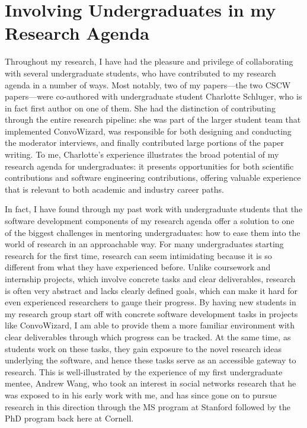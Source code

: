 \documentclass[12pt,letterpaper]{article}
\begin{document}
\section{Involving Undergraduates in my Research Agenda}
Throughout my research, I have had the pleasure and privilege of collaborating with several undergraduate students, who have contributed to my research agenda in a number of ways.
Most notably, two of my papers---the two CSCW papers---were co-authored with undergraduate student Charlotte Schluger, who is in fact first author on one of them.
She had the distinction of contributing through the entire research pipeline: she was part of the larger student team that implemented ConvoWizard, was responsible for both designing and conducting the moderator interviews, and finally contributed large portions of the paper writing.
To me, Charlotte's experience illustrates the broad potential of my research agenda for undergraduates: it presents opportunities for both scientific contributions and software engineering contributions, offering valuable experience that is relevant to both academic and industry career paths.

In fact, I have found through my past work with undergraduate students that the software development components of my research agenda offer a solution to one of the biggest challenges in mentoring undergraduates: how to ease them into the world of research in an approachable way.
For many undergraduates starting research for the first time, research can seem intimidating because it is so different from what they have experienced before.
Unlike coursework and internship projects, which involve concrete tasks and clear deliverables, research is often very abstract and lacks clearly defined goals, which can make it hard for even experienced researchers to gauge their progress.
By having new students in my research group start off with concrete software development tasks in projects like ConvoWizard, I am able to provide them a more familiar environment with clear deliverables through which progress can be tracked.
At the same time, as students work on these tasks, they gain exposure to the novel research ideas underlying the software, and hence these tasks serve as an accessible gateway to research.
This is well-illustrated by the experience of my first undergraduate mentee, Andrew Wang, who took an interest in social networks research that he was exposed to in his early work with me, and has since gone on to pursue research in this direction through the MS program at Stanford followed by the PhD program back here at Cornell.
\end{document}
